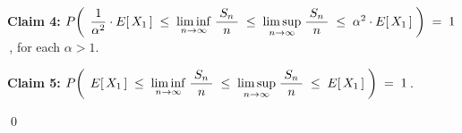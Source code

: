 \begin{enumerate}
\vskip 0.8cm
\noindent
\textbf{Claim 4:}\quad\quad
$P\!\left(\;\,
	\dfrac{1}{\alpha^{2}} \cdot E[\,X_{1}\,]
	\;\leq\;
		\underset{n\rightarrow\infty}{\liminf}\;
		\dfrac{{\color{white}.}S_{n}{\color{white}.}}{n}
	\;\leq\;
		\underset{n\rightarrow\infty}{\limsup}\;
		\dfrac{{\color{white}.}S_{n}{\color{white}.}}{n}
	\;\leq\;
		\alpha^{2} \cdot E[\,X_{1}\,]
	\;\right)
\;=\;1$\,, for each $\alpha > 1$.

\vskip 0.8cm
\noindent
\textbf{Claim 5:}\quad\quad
$P\!\left(\;\,
	E[\,X_{1}\,]
	\;\leq\;
		\underset{n\rightarrow\infty}{\liminf}\;
		\dfrac{{\color{white}.}S_{n}{\color{white}.}}{n}
	\;\leq\;
		\underset{n\rightarrow\infty}{\limsup}\;
		\dfrac{{\color{white}.}S_{n}{\color{white}.}}{n}
	\;\leq\;
		E[\,X_{1}\,]
	\;\right)
\;=\;1$\,.

\end{enumerate}

\qed

\renewcommand{\theenumi}{\roman{enumi}}
\renewcommand{\labelenumi}{\textnormal{(\theenumi)}$\;\;$}

